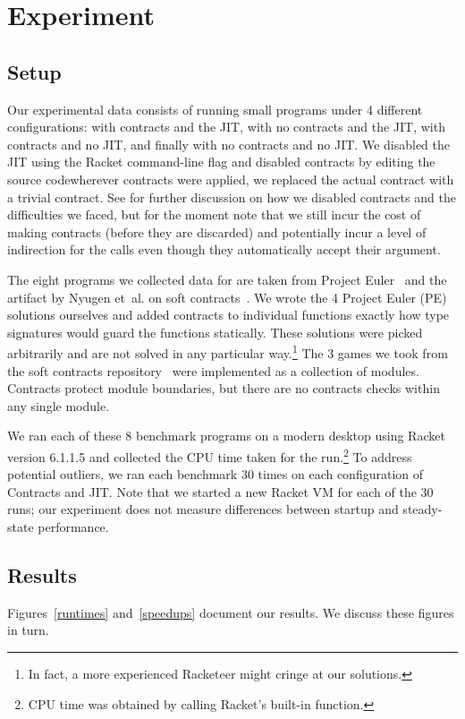 \section{Experiment}
\label{experiment}
\subsection{Setup}
Our experimental data consists of running small programs under 4 different configurations: with contracts and the JIT, with no contracts and the JIT, with contracts and no JIT, and finally with no contracts and no JIT.
We disabled the JIT using the Racket command-line flag  and disabled contracts by editing the  source code\textemdash wherever contracts were applied, we replaced the actual contract with a trivial  contract.
See  for further discussion on how we disabled contracts and the difficulties we faced, but for the moment note that we still incur the cost of making contracts (before they are discarded) and potentially incur a level of indirection for the  calls even though they automatically accept their argument.

The eight programs we collected data for are taken from Project Euler~\cite{project-euler} and the artifact by Nyugen et~al. on soft contracts~\cite{soft-contracts}.
We wrote the 4 Project Euler (PE) solutions ourselves and added contracts to individual functions exactly how type signatures would guard the functions statically.
These solutions were picked arbitrarily and are not solved in any particular way.\footnote{In fact, a more experienced Racketeer might cringe at our solutions.}
The 3 games we took from the soft contracts repository~\cite{soft-contracts-repo} were implemented as a collection of modules.
Contracts protect module boundaries, but there are no contracts checks within any single module.

We ran each of these 8 benchmark programs on a modern desktop using Racket version 6.1.1.5 and collected the CPU time taken for the run.\footnote{CPU time was obtained by calling Racket's built-in  function.}
To address potential outliers, we ran each benchmark 30 times on each configuration of Contracts and JIT.
Note that we started a new Racket VM for each of the 30 runs; our experiment does not measure differences between startup and steady-state performance.

\subsection{Results}
Figures~\ref{runtimes} and~\ref{speedups} document our results.
We discuss these figures in turn.

